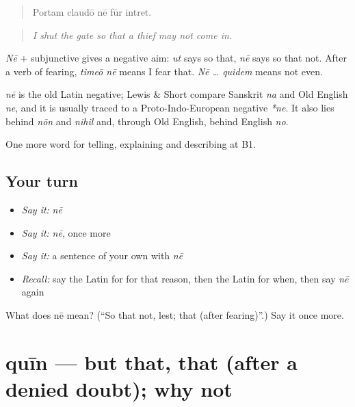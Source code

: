 \begin{quote}
Portam claudō nē fūr intret.
\end{quote}

\begin{quote}
\emph{I shut the gate so that a thief may not come in.}
\end{quote}

\emph{Nē} + subjunctive gives a negative aim: \emph{ut} says so that, \emph{nē} says so that not. After a verb of fearing, \emph{timeō nē} means I fear that. \emph{Nē … quidem} means not even.

\begin{cousinweb}
\emph{nē} is the old Latin negative; Lewis \& Short compare Sanskrit \emph{na} and Old English \emph{ne}, and it is usually traced to a Proto-Indo-European negative \emph{*ne}. It also lies behind \emph{nōn} and \emph{nihil} and, through Old English, behind English \emph{no}.
\end{cousinweb}

\begin{grammarlens}[title={What you've built}]
One more word for telling, explaining and describing at B1.
\end{grammarlens}

\subsection*{Your turn}
\begin{itemize}
\raggedright
  \item \emph{Say it:} \emph{nē}
  \item \emph{Say it:} \emph{nē}, once more
  \item \emph{Say it:} a sentence of your own with \emph{nē}
  \item \emph{Recall:} say the Latin for for that reason, then the Latin for when, then say \emph{nē} again
\end{itemize}

\begin{tcolorbox}[breakable,colback=teal!4,colframe=teal!35!black,title={Before you move on}]
What does nē mean? (\textquotedblleft{}So that not, lest; that (after fearing)\textquotedblright{}.) Say it once more.
\end{tcolorbox}
\section[quīn]{quīn — but that, that (after a denied doubt); why not}

